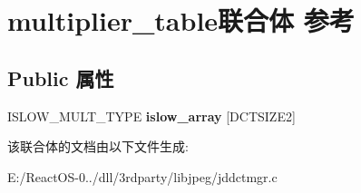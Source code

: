 \hypertarget{unionmultiplier__table}{}\section{multiplier\+\_\+table联合体 参考}
\label{unionmultiplier__table}
\subsection*{Public 属性}
\begin{DoxyCompactItemize}
\item 
\mbox{\label{unionmultiplier__table_a8585c9759405a74e7cbd4d6b3f8da073}} 
I\+S\+L\+O\+W\+\_\+\+M\+U\+L\+T\+\_\+\+T\+Y\+PE {\bfseries islow\+\_\+array} \mbox{[}D\+C\+T\+S\+I\+Z\+E2\mbox{]}
\end{DoxyCompactItemize}


该联合体的文档由以下文件生成\+:\begin{DoxyCompactItemize}
\item 
E\+:/\+React\+O\+S-\/0../dll/3rdparty/libjpeg/jddctmgr.\+c\end{DoxyCompactItemize}
